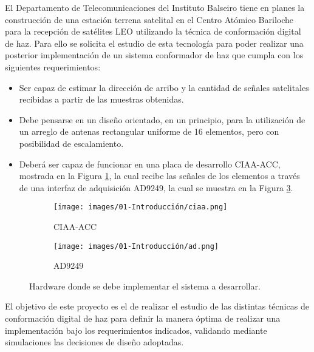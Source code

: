 El Departamento de Telecomunicaciones del Instituto Balseiro tiene en planes la construcción de una estación terrena satelital en el Centro Atómico Bariloche para la recepción de satélites LEO utilizando la técnica de conformación digital de haz. Para ello se solicita el estudio de esta tecnología para poder realizar una posterior implementación de un sistema conformador de haz que cumpla con los siguientes requerimientos:

\begin{itemize}
    \item Ser capaz de estimar la dirección de arribo y la cantidad de señales satelitales recibidas a partir de las muestras obtenidas.
    \item Debe pensarse en un diseño orientado, en un principio, para la utilización de un arreglo de antenas rectangular uniforme de 16 elementos, pero con posibilidad de escalamiento.
    \item Deberá ser capaz de funcionar en una placa de desarrollo CIAA-ACC, mostrada en la Figura \ref{fig:intro_ciaa}, la cual recibe las señales de los elementos a través de una interfaz de adquisición AD9249, la cual se muestra en la Figura \ref{fig:intro_ad}.
\end{itemize}

\begin{figure}[ht!]
    \centering
    \begin{subfigure}[b]{0.49\textwidth}
        \centering
        \texttt{[image: images/01-Introducción/ciaa.png]}
        \caption{CIAA-ACC}
        \label{fig:intro_ciaa}
    \end{subfigure}
    \hfill
    \begin{subfigure}[b]{0.49\textwidth}
        \centering
        \texttt{[image: images/01-Introducción/ad.png]}
        \caption{AD9249}
        \label{fig:intro_ad}
    \end{subfigure}
    \caption{Hardware donde se debe implementar el sistema a desarrollar.}
\end{figure}

El objetivo de este proyecto es el de realizar el estudio de las distintas técnicas de conformación digital de haz para definir la manera óptima de realizar una implementación bajo los requerimientos indicados, validando mediante simulaciones las decisiones de diseño adoptadas.

